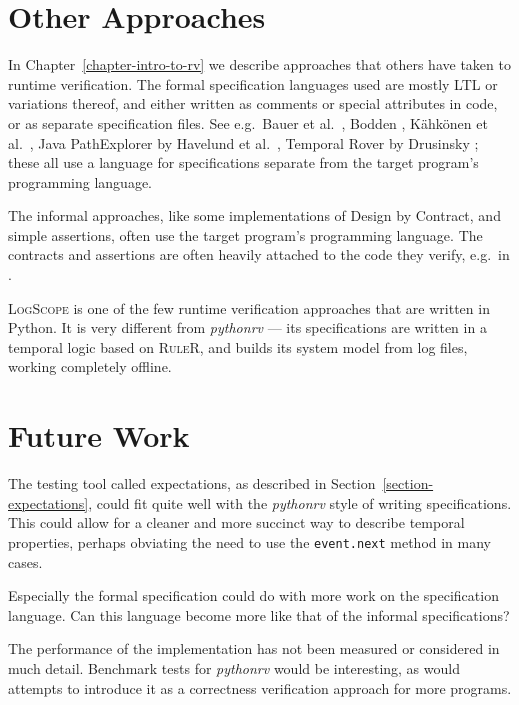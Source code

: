 \documentclass[a4paper,11pt]{kth-mag}
\theoremstyle{definition}
\begin{document}
\section{Other Approaches}

In Chapter~\ref{chapter-intro-to-rv} we describe approaches that others have
taken to runtime verification. The formal specification languages used are
mostly LTL or variations thereof, and either written as comments or special
attributes in code, or as separate specification files. See e.g.\ Bauer et
al.\ \cite{bauer06monitoring}, Bodden \cite{bodden05efficientrv}, Kähkönen et
al.\ \cite{kahkonen09lime}, Java PathExplorer by Havelund et al.\
\cite{havelund04jpax}, Temporal Rover by Drusinsky
\cite{drusinsky00temporalrover}; these all use a language for specifications
separate from the target program's programming language.

The informal approaches, like some implementations of Design by Contract, and
simple assertions, often use the target program's programming language. The
contracts and assertions are often heavily attached to the code they verify,
e.g.\ in \cite{bartetzko01jass,meyer92applyingdbc}.

\textsc{LogScope} \cite{barringer09tutorial} is one of the few runtime
verification approaches that are written in Python. It is very different from
\textit{pythonrv} --- its specifications are written in a temporal logic based
on \textsc{RuleR}, and builds its system model from log files, working
completely offline.

\section{Future Work}

The testing tool called expectations, as described in
Section~\ref{section-expectations}, could fit quite well with the
\textit{pythonrv} style of writing specifications. This could allow for a
cleaner and more succinct way to describe temporal properties, perhaps
obviating the need to use the \texttt{event.next} method in many cases.

Especially the formal specification could do with more work on the
specification language. Can this language become more like that of the informal
specifications?

The performance of the implementation has not been measured or considered in
much detail. Benchmark tests for \textit{pythonrv} would be interesting, as
would attempts to introduce it as a correctness verification approach for more
programs.
\end{document}
